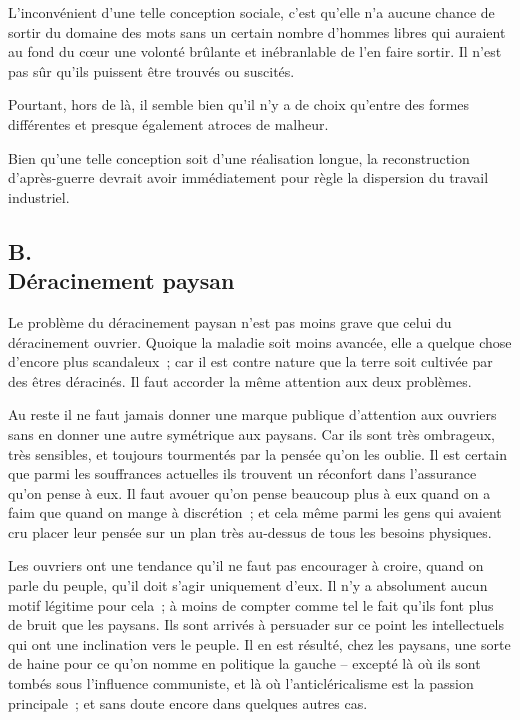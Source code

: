\documentclass[french,twoside]{book} %
\begin{document}
L'inconvénient d'une telle conception sociale, c'est qu'elle n'a aucune chance de sortir du domaine des mots sans un certain nombre d'hommes libres qui auraient au fond du cœur une volonté brûlante et inébranlable de l'en faire sortir. Il n'est pas sûr qu'ils puissent être trouvés ou suscités.\par
Pourtant, hors de là, il semble bien qu'il n'y a de choix qu'entre des formes différentes et presque également atroces de malheur.\par
Bien qu'une telle conception soit d'une réalisation longue, la reconstruction d'après-guerre devrait avoir immédiatement pour règle la dispersion du travail industriel.
\subsection[{B. Déracinement paysan}]{B. \\
Déracinement paysan}
\noindent \par
Le problème du déracinement paysan n'est pas moins grave que celui du déracinement ouvrier. Quoique la maladie soit moins avancée, elle a quelque chose d'encore plus scandaleux ; car il est contre nature que la terre soit cultivée par des êtres déracinés. Il faut accorder la même attention aux deux problèmes.\par
Au reste il ne faut jamais donner une marque publique d'attention aux ouvriers sans en donner une autre symétrique aux paysans. Car ils sont très ombrageux, très sensibles, et toujours tourmentés par la pensée qu'on les oublie. Il est certain que parmi les souffrances actuelles ils trouvent un réconfort dans l'assurance qu'on pense à eux. Il faut avouer qu'on pense beaucoup plus à eux quand on a faim que quand on mange à discrétion ; et cela même parmi les gens qui avaient cru placer leur pensée sur un plan très au-dessus de tous les besoins physiques.\par
Les ouvriers ont une tendance qu'il ne faut pas encourager à croire, quand on parle du peuple, qu'il doit s'agir uniquement d'eux. Il n'y a absolument aucun motif légitime pour cela ; à moins de compter comme tel le fait qu'ils font plus de bruit que les paysans. Ils sont arrivés à persuader sur ce point les intellectuels qui ont une inclination vers le peuple. Il en est résulté, chez les paysans, une sorte de haine pour ce qu'on nomme en politique la gauche – excepté là où ils sont tombés sous l'influence communiste, et là où l'anticléricalisme est la passion principale ; et sans doute encore dans quelques autres cas.\par
\end{document}
